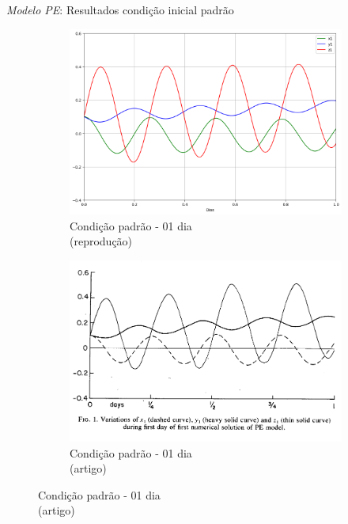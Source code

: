 \begin{frame}{\textit{Modelo PE}: Resultados condição inicial padrão}
	\begin{figure}
		\centering
		\begin{subfigure}[b]{0.45\textwidth}
			\centering
			\includegraphics[width=\textwidth]{img/p01d01.png}
			\caption{Condição padrão - 01 dia\\(reprodução)}
			\label{fig:p01d01}
		\end{subfigure}
		\hfill
		\begin{subfigure}[b]{0.45\textwidth}
			\centering
			\includegraphics[width=\textwidth]{img/p01d01rel.png}
			\caption{Condição padrão - 01 dia\\(artigo)}
			\label{fig:p01d01rel}
		\end{subfigure}
	\end{figure}
\end{frame}


